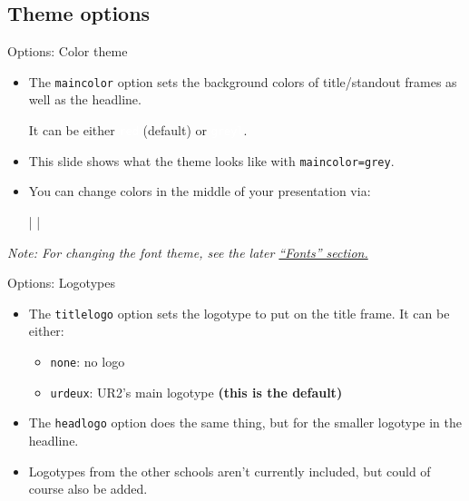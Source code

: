 \documentclass[10pt]{beamer}
\begin{document}
\subsection{Theme options}

{
\begin{frame}[fragile,stretch=3]{Options: Color theme}

    \begin{itemize}
    \item The \texttt{maincolor} option sets the background colors of title/standout frames as well as the      headline.\medskip
    
    It can be either \colorbox{ur2Rouge}{\textcolor{white}{\texttt{red}}} (default) or \colorbox{ur2Gris}{\textcolor{white}{\texttt{grey{\vphantom l}}}}.

    \item This slide shows what the theme looks like with \texttt{maincolor=grey}.
  
    \item You can change colors in the middle of your presentation via:\medskip

          |   |
    \end{itemize}
    
    \medskip
    \textit{Note: For changing the font theme, see the later \hyperlink{selectfonts}{\textcolor{ur2Bleu}{``Fonts'' section.}}}
\end{frame}
}

\begin{frame}[stretch]{Options: Logotypes}
  \begin{itemize}
    \item The \texttt{titlelogo} option sets the logotype to put on the title frame.  It can be either:
    \begin{itemize}
        \item \texttt{none}: no logo
        \item \texttt{urdeux}: UR2's main logotype \alert{\bf (this is the default)}
    \end{itemize}
    \item The \texttt{headlogo} option does the same thing, but for the smaller logotype in the headline.
    \item Logotypes from the other schools aren't currently included, but could of course also be added.
  \end{itemize}
\end{frame}
\end{document}
